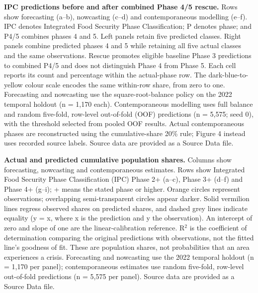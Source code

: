 \caption{\textbf{IPC predictions before and after combined Phase 4/5 rescue.} Rows show forecasting (a–b), nowcasting (c–d) and contemporaneous modelling (e–f). IPC denotes Integrated Food Security Phase Classification; P denotes phase; and P4/5 combines phases 4 and 5. Left panels retain five predicted classes. Right panels combine predicted phases 4 and 5 while retaining all five actual classes and the same observations. Rescue promotes eligible baseline Phase 3 predictions to combined P4/5 and does not distinguish Phase 4 from Phase 5. Each cell reports its count and percentage within the actual-phase row. The dark-blue-to-yellow colour scale encodes the same within-row share, from zero to one. Forecasting and nowcasting use the square-root-balance policy on the 2022 temporal holdout (n = 1,170 each). Contemporaneous modelling uses full balance and random five-fold, row-level out-of-fold (OOF) predictions (n = 5,575; seed 0), with the threshold selected from pooled OOF results. Actual contemporaneous phases are reconstructed using the cumulative-share 20\% rule; Figure 4 instead uses recorded source labels. Source data are provided as a Source Data file.}

\caption{\textbf{Actual and predicted cumulative population shares.} Columns show forecasting, nowcasting and contemporaneous estimates. Rows show Integrated Food Security Phase Classification (IPC) Phase 2+ (a–c), Phase 3+ (d–f) and Phase 4+ (g–i); + means the stated phase or higher. Orange circles represent observations; overlapping semi-transparent circles appear darker. Solid vermilion lines regress observed shares on predicted shares, and dashed grey lines indicate equality (y = x, where x is the prediction and y the observation). An intercept of zero and slope of one are the linear-calibration reference. R$^2$ is the coefficient of determination comparing the original predictions with observations, not the fitted line's goodness of fit. These are population shares, not probabilities that an area experiences a crisis. Forecasting and nowcasting use the 2022 temporal holdout (n = 1,170 per panel); contemporaneous estimates use random five-fold, row-level out-of-fold predictions (n = 5,575 per panel). Source data are provided as a Source Data file.}

